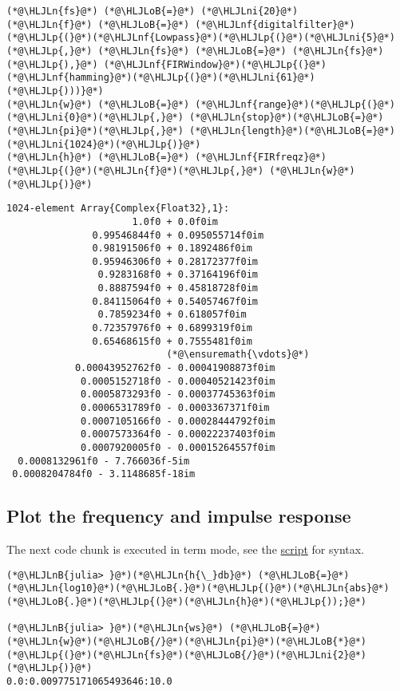 \documentclass[12pt,a4paper]{article}
\newcommand{\HLJLn}[1]{#1}
\newcommand{\HLJLnf}[1]{\textcolor[RGB]{66,102,213}{#1}}
\newcommand{\HLJLnB}[1]{\textcolor[RGB]{59,151,46}{#1}}
\newcommand{\HLJLni}[1]{\textcolor[RGB]{59,151,46}{#1}}
\newcommand{\HLJLoB}[1]{\textcolor[RGB]{102,102,102}{\textbf{#1}}}
\newcommand{\HLJLp}[1]{#1}
\begin{document}
\begin{lstlisting}
(*@\HLJLn{fs}@*) (*@\HLJLoB{=}@*) (*@\HLJLni{20}@*)
(*@\HLJLn{f}@*) (*@\HLJLoB{=}@*) (*@\HLJLnf{digitalfilter}@*)(*@\HLJLp{(}@*)(*@\HLJLnf{Lowpass}@*)(*@\HLJLp{(}@*)(*@\HLJLni{5}@*)(*@\HLJLp{,}@*) (*@\HLJLn{fs}@*) (*@\HLJLoB{=}@*) (*@\HLJLn{fs}@*)(*@\HLJLp{),}@*) (*@\HLJLnf{FIRWindow}@*)(*@\HLJLp{(}@*)(*@\HLJLnf{hamming}@*)(*@\HLJLp{(}@*)(*@\HLJLni{61}@*)(*@\HLJLp{)))}@*)
(*@\HLJLn{w}@*) (*@\HLJLoB{=}@*) (*@\HLJLnf{range}@*)(*@\HLJLp{(}@*)(*@\HLJLni{0}@*)(*@\HLJLp{,}@*) (*@\HLJLn{stop}@*)(*@\HLJLoB{=}@*)(*@\HLJLn{pi}@*)(*@\HLJLp{,}@*) (*@\HLJLn{length}@*)(*@\HLJLoB{=}@*)(*@\HLJLni{1024}@*)(*@\HLJLp{)}@*)
(*@\HLJLn{h}@*) (*@\HLJLoB{=}@*) (*@\HLJLnf{FIRfreqz}@*)(*@\HLJLp{(}@*)(*@\HLJLn{f}@*)(*@\HLJLp{,}@*) (*@\HLJLn{w}@*)(*@\HLJLp{)}@*)
\end{lstlisting}

\begin{lstlisting}
1024-element Array{Complex{Float32},1}:
                      1.0f0 + 0.0f0im          
               0.99546844f0 + 0.095055714f0im  
               0.98191506f0 + 0.1892486f0im    
               0.95946306f0 + 0.28172377f0im   
                0.9283168f0 + 0.37164196f0im   
                0.8887594f0 + 0.45818728f0im   
               0.84115064f0 + 0.54057467f0im   
                0.7859234f0 + 0.618057f0im     
               0.72357976f0 + 0.6899319f0im    
               0.65468615f0 + 0.7555481f0im    
                            (*@\ensuremath{\vdots}@*)                  
            0.00043952762f0 - 0.00041908873f0im
             0.0005152718f0 - 0.00040521423f0im
             0.0005873293f0 - 0.00037745363f0im
             0.0006531789f0 - 0.0003367371f0im 
             0.0007105166f0 - 0.00028444792f0im
             0.0007573364f0 - 0.00022237403f0im
             0.0007920005f0 - 0.00015264557f0im
  0.0008132961f0 - 7.766036f-5im               
 0.0008204784f0 - 3.1148685f-18im
\end{lstlisting}


\subsection{Plot the frequency and impulse response}
The next code chunk is executed in term mode, see the \href{FIR_design.jl}{script} for syntax.


\begin{lstlisting}
(*@\HLJLnB{julia> }@*)(*@\HLJLn{h{\_}db}@*) (*@\HLJLoB{=}@*) (*@\HLJLn{log10}@*)(*@\HLJLoB{.}@*)(*@\HLJLp{(}@*)(*@\HLJLn{abs}@*)(*@\HLJLoB{.}@*)(*@\HLJLp{(}@*)(*@\HLJLn{h}@*)(*@\HLJLp{));}@*)

(*@\HLJLnB{julia> }@*)(*@\HLJLn{ws}@*) (*@\HLJLoB{=}@*) (*@\HLJLn{w}@*)(*@\HLJLoB{/}@*)(*@\HLJLn{pi}@*)(*@\HLJLoB{*}@*)(*@\HLJLp{(}@*)(*@\HLJLn{fs}@*)(*@\HLJLoB{/}@*)(*@\HLJLni{2}@*)(*@\HLJLp{)}@*)
0.0:0.009775171065493646:10.0
\end{lstlisting}
\end{document}

